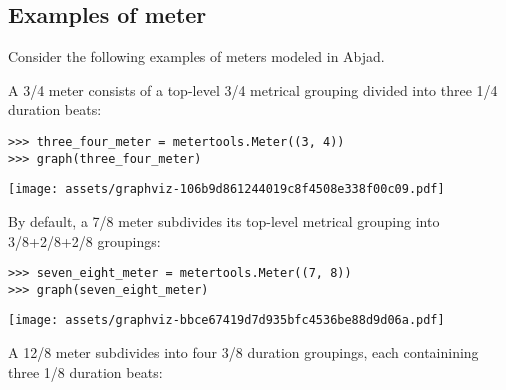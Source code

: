 \subsection{Examples of meter} %

Consider the following examples of meters modeled in Abjad.

A 3/4 meter consists of a top-level 3/4 metrical grouping divided into three
1/4 duration beats:

\begin{comment}
<abjad>
three_four_meter = metertools.Meter((3, 4))
graph(three_four_meter)
</abjad>
\end{comment}

\begin{singlespacing}
\vspace{-0.5\baselineskip}
\begin{lstlisting}
>>> three_four_meter = metertools.Meter((3, 4))
>>> graph(three_four_meter)
\end{lstlisting}
\noindent\texttt{[image: assets/graphviz-106b9d861244019c8f4508e338f00c09.pdf]}
\end{singlespacing}

\noindent By default, a 7/8 meter subdivides its top-level metrical grouping
into 3/8+2/8+2/8 groupings:

\begin{comment}
<abjad>
seven_eight_meter = metertools.Meter((7, 8))
graph(seven_eight_meter)
</abjad>
\end{comment}

\begin{singlespacing}
\vspace{-0.5\baselineskip}
\begin{lstlisting}
>>> seven_eight_meter = metertools.Meter((7, 8))
>>> graph(seven_eight_meter)
\end{lstlisting}
\noindent\texttt{[image: assets/graphviz-bbce67419d7d935bfc4536be88d9d06a.pdf]}
\end{singlespacing}

\noindent A 12/8 meter subdivides into four 3/8 duration groupings, each
containining three 1/8 duration beats:

\begin{comment}
<abjad>
twelve_eight_meter = metertools.Meter((12, 8))
graph(twelve_eight_meter)
</abjad>
\end{comment}

